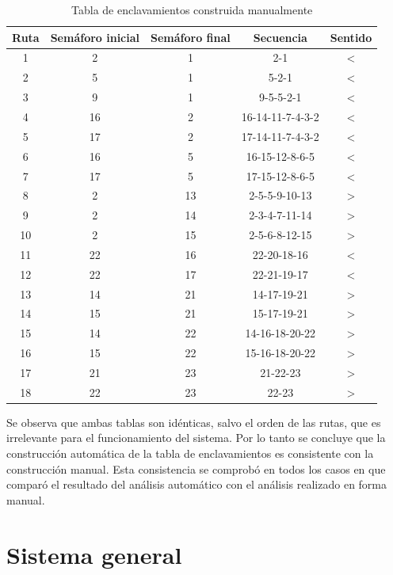 	 \begin{table}[!hbt]
	\caption{Tabla de enclavamientos construida manualmente}
	\label{tabla_manual}
	\centering
	\begin{tabular}{ c  c  c  c  c }
	\hline
	Ruta & Semáforo inicial & Semáforo final & Secuencia & Sentido \\	
	\hline
		1 & 2 & 1 & 2-1 & < \\
		2 & 5 & 1 & 5-2-1 & < \\
		3 & 9 & 1 & 9-5-5-2-1 & < \\
		4 & 16 & 2 & 16-14-11-7-4-3-2 & < \\
		5 & 17 & 2 & 17-14-11-7-4-3-2 & < \\
		6 & 16 & 5 & 16-15-12-8-6-5 & < \\
		7 & 17 & 5 & 17-15-12-8-6-5 & < \\
		8 & 2 & 13 & 2-5-5-9-10-13 & > \\
		9 & 2 & 14 & 2-3-4-7-11-14 & > \\
		10 & 2 & 15 & 2-5-6-8-12-15 & > \\
		11 & 22 & 16 & 22-20-18-16 & < \\
		12 & 22 & 17 & 22-21-19-17 & < \\
		13 & 14 & 21 & 14-17-19-21 & > \\
		14 & 15 & 21 & 15-17-19-21 & > \\	
		15 & 14 & 22 & 14-16-18-20-22 & > \\	
		16 & 15 & 22 & 15-16-18-20-22 & > \\		
		17 & 21 & 23 & 21-22-23 & > \\	
		18 & 22 & 23 & 22-23 & > \\
	\end{tabular}
	\end{table}	 
	 
	 \vspace{2cm}
	 
	 Se observa que ambas tablas son idénticas, salvo el orden de las rutas, que es irrelevante para el funcionamiento del sistema. Por lo tanto se concluye que la construcción automática de la tabla de enclavamientos es consistente con la construcción manual. Esta consistencia se comprobó en todos los casos en que comparó el resultado del análisis automático con el análisis realizado en forma manual.			

\section{Sistema general}

